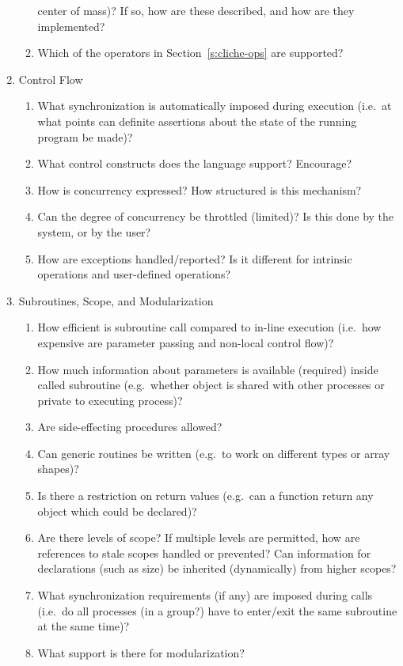 \begin{enumerate}
\begin{enumerate}
	center of mass)?
	If so, how are these described, and how are they implemented?
  \item Which of the operators in Section~\ref{s:cliche-ops} are supported?
  \end{enumerate}
\item Control Flow
  \begin{enumerate}
  \item What synchronization is automatically imposed during execution
	(i.e.\ at what points can definite assertions about the state
	of the running program be made)?
  \item What control constructs does the language support?  Encourage?
  \item How is concurrency expressed?  How structured is this mechanism?
  \item Can the degree of concurrency be throttled (limited)?
	Is this done by the system, or by the user?
  \item How are exceptions handled/reported?
	Is it different for intrinsic operations and user-defined operations?
  \end{enumerate}
\item Subroutines, Scope, and Modularization
  \begin{enumerate}
  \item How efficient is subroutine call compared to in-line execution
	(i.e.\ how expensive are parameter passing and non-local control flow)?
  \item How much information about parameters is available (required)
	inside called subroutine
	(e.g.\ whether object is shared with other processes or private
	to executing process)?
  \item Are side-effecting procedures allowed?
  \item Can generic routines be written
	(e.g.\ to work on different types or array shapes)?
  \item Is there a restriction on return values (e.g.\ can a function return
	any object which could be declared)?
  \item Are there levels of scope?
	If multiple levels are permitted, how are references to stale scopes
	handled or prevented?
	Can information for declarations (such as size) be inherited (dynamically)
	from higher scopes?
  \item What synchronization requirements (if any) are imposed during calls
	(i.e.\ do all processes (in a group?) have to enter/exit the same subroutine
	at the same time)?
  \item What support is there for modularization?

\end{enumerate}
\end{enumerate}
